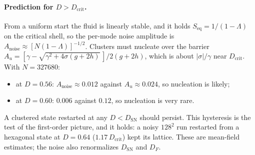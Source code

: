 \documentclass[11pt]{article}
\begin{document}
\paragraph{Prediction for $D>D_{\mathrm{crit}}$.} From a uniform start the
fluid is linearly stable, and it holds $S_{\mathrm{eq}} = 1/(1-\Lambda)$ on the
critical shell, so the per-mode noise amplitude is
$A_{\mathrm{noise}}\approx[N(1-\Lambda)]^{-1/2}$. Clusters must nucleate over
the barrier $A_u = [\gamma-\sqrt{\gamma^2+4\sigma(g+2h)}\,]/2(g+2h)$, which is
about $|\sigma|/\gamma$ near $D_{\mathrm{crit}}$. With $N=327680$:
\begin{itemize}
  \item at $D = 0.56$: $A_{\mathrm{noise}}\approx0.012$ against $A_u\approx0.024$,
        so nucleation is likely;
  \item at $D = 0.60$: $0.006$ against $0.12$, so nucleation is very rare.
\end{itemize}
A clustered state restarted at any $D<D_{\mathrm{SN}}$ should persist. This
hysteresis is the test of the first-order picture, and it holds: a noisy
$128^2$ run restarted from a hexagonal state at $D=0.64$ ($1.17\,D_{\mathrm{crit}}$)
kept its lattice. These are mean-field estimates; the noise also renormalizes
$D_{\mathrm{SN}}$ and $D_F$.
\end{document}
